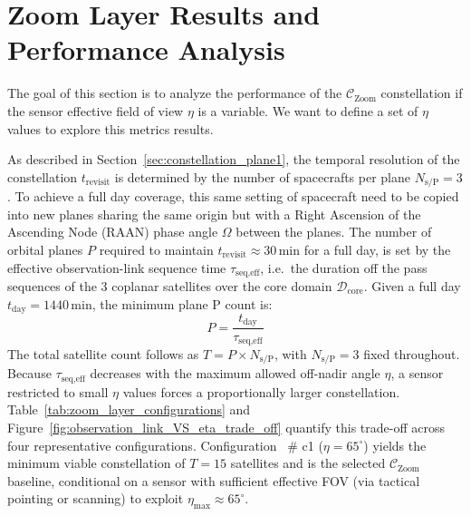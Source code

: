\section{Zoom Layer Results and Performance Analysis}
\label{sec:zoom_layer}

The goal of this section is to analyze the performance of the $\mathcal{C}_{\text{Zoom}}$ constellation if the sensor effective field of view $\eta$ is a variable. We want to define a set of $\eta$ values to explore this metrics results. 

As described in Section~\ref{sec:constellation_plane1}, the temporal resolution of the constellation $t_{\text{revisit}}$ is determined by the number of spacecrafts per plane $N_{\text{s/P}} = 3$. To achieve a full day coverage, this same setting of spacecraft need to be copied into new planes sharing the same origin but with a Right Ascension of the Ascending Node (RAAN) phase angle $\Omega$ between the planes. The number of orbital planes $P$ required to maintain $t_{\text{revisit}} \approx 30$\,min for a full day, is set by the effective observation-link sequence time $\tau_{\text{seq,eff}}$, i.e.\ the duration off the pass sequences of the 3 coplanar satellites over the core domain $\mathcal{D}_{\text{core}}$. Given a full day $t_{\text{day}} = 1440$\,min, the minimum plane P count is:
\begin{equation}
    P = \frac{t_{\text{day}}}{\tau_{\text{seq,eff}}}
    \label{eq:planes_from_tau}
\end{equation}
The total satellite count follows as $T = P \times N_{\text{s/P}}$, with $N_{\text{s/P}} = 3$ fixed throughout. Because $\tau_{\text{seq,eff}}$ decreases with the maximum allowed off-nadir angle $\eta$, a sensor restricted to small $\eta$ values forces a proportionally larger constellation. Table~\ref{tab:zoom_layer_configurations} and Figure~\ref{fig:observation_link_VS_eta_trade_off} quantify this trade-off across four representative configurations. Configuration ~\# c1 ($\eta = 65^{\circ}$) yields the minimum viable constellation of $T = 15$ satellites and is the selected $\mathcal{C}_{\text{Zoom}}$ baseline, conditional on a sensor with sufficient effective FOV (via tactical pointing or scanning) to exploit $\eta_{\max} \approx 65^{\circ}$.

